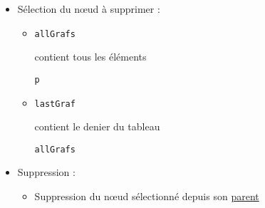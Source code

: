 \begin{otherlanguage}{english}

\begin{Shaded}
\begin{Highlighting}[]
 \NormalTok{() }\OperatorTok{\{}
   \OperatorTok{=} \NormalTok{(}\NormalTok{)}\OperatorTok{;}

   \NormalTok{ (} \OperatorTok{>} \NormalTok{) }\OperatorTok{\{}
      \OperatorTok{=} \NormalTok{ (}\NormalTok{)}\OperatorTok{;}
      \OperatorTok{;}
   \OperatorTok{\}}
    \OperatorTok{\{}
      \NormalTok{(}\NormalTok{)}\OperatorTok{;}
   \OperatorTok{\}}
\OperatorTok{\}}
\end{Highlighting}
\end{Shaded}

\end{otherlanguage}

\begin{itemize}
\tightlist
\item
  Sélection du nœud à supprimer :

  \begin{itemize}
  \tightlist
  \item
    \begin{otherlanguage}{english}\texttt{allGrafs}\end{otherlanguage}
    contient tous les éléments
    \begin{otherlanguage}{english}\texttt{p}\end{otherlanguage}
  \item
    \begin{otherlanguage}{english}\texttt{lastGraf}\end{otherlanguage}
    contient le denier du tableau
    \begin{otherlanguage}{english}\texttt{allGrafs}\end{otherlanguage}
  \end{itemize}
\item
  Suppression :

  \begin{itemize}
  \tightlist
  \item
    Suppression du nœud sélectionné depuis son
    \href{https://developer.mozilla.org/en-US/docs/Web/API/Node/parentNode}{parent}
  \end{itemize}
\end{itemize}

